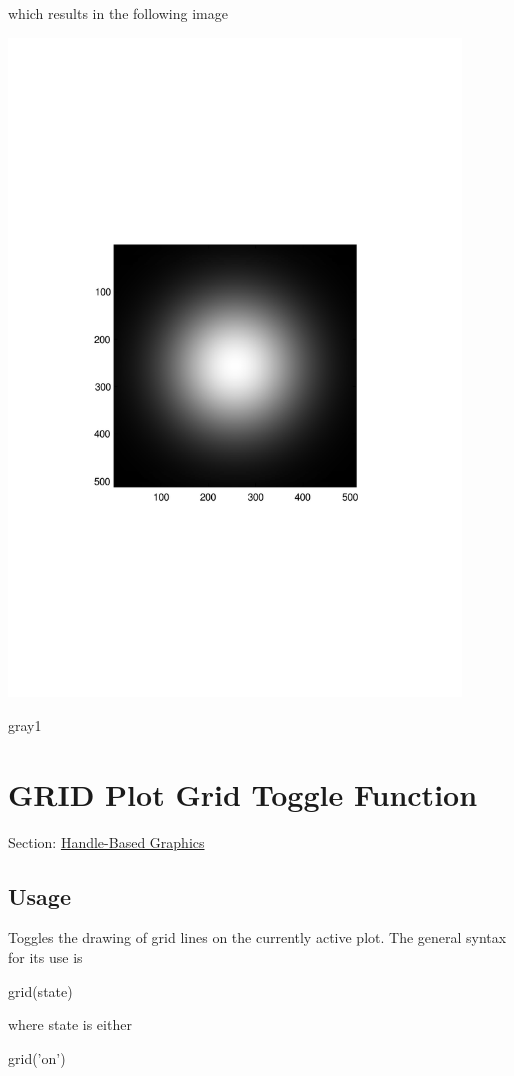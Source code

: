 which results in the following image  
\begin{DoxyImage}
\includegraphics[width=12cm]{gray1}
\caption{gray1}
\end{DoxyImage}
 \hypertarget{handle_grid}{}\section{G\-R\-I\-D Plot Grid Toggle Function}\label{handle_grid}
Section\-: \hyperlink{sec_handle}{Handle-\/\-Based Graphics} \hypertarget{vtkwidgets_vtkxyplotwidget_Usage}{}\subsection{Usage}\label{vtkwidgets_vtkxyplotwidget_Usage}
Toggles the drawing of grid lines on the currently active plot. The general syntax for its use is \begin{DoxyVerb}   grid(state)
\end{DoxyVerb}
 where {\ttfamily state} is either \begin{DoxyVerb}   grid('on')
\end{DoxyVerb}
